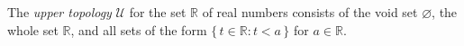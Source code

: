 The \emph{upper topology} $\mathcal{U}$ for the set $\mathbb{R}$ of real numbers consists of the void set $\varnothing$, the whole set $\mathbb{R}$, and all sets of the form $\{\, t \in \mathbb{R} : t < a \,\}$ for $a \in \mathbb{R}$.
